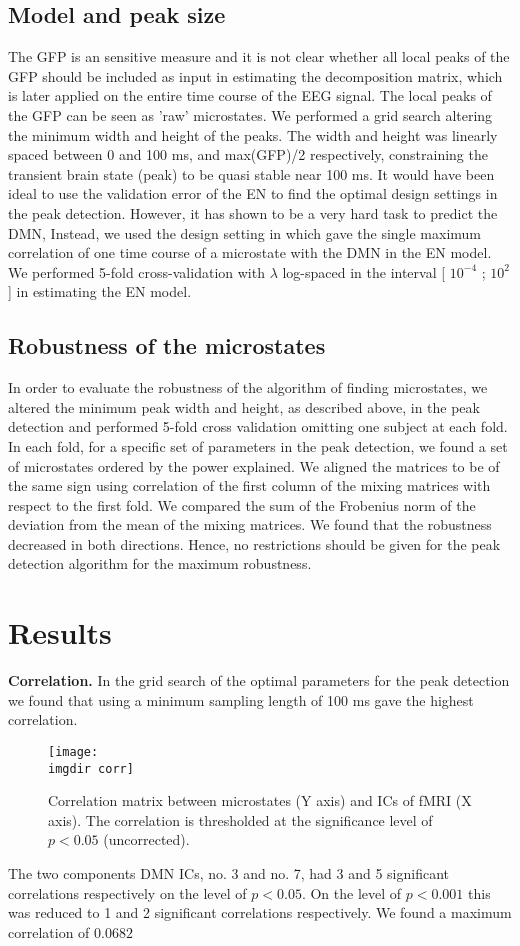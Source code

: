 \documentclass{article}
\newcommand{\imgdir}{Images/} %
\begin{document}
\subsection{Model and peak size}
The GFP is an sensitive measure and it is not clear whether all local peaks of the GFP should be included as input in estimating the decomposition matrix, which is later applied on the entire time course of the EEG signal. The local peaks of the GFP can be seen as 'raw' microstates. We performed a grid search altering the minimum width and height of the peaks. The width and height was linearly spaced between 0 and 100 ms, and max(GFP)/2 respectively, constraining the transient brain state (peak) to be quasi stable near 100 ms.
It would have been ideal to use the validation error of the EN to find the optimal design settings in the peak detection. However, it has shown to be a very hard task to predict the DMN, Instead, we used the design setting in which gave the single maximum correlation of one time course of a microstate with the DMN in the EN model.
We performed 5-fold cross-validation with $\lambda$ log-spaced in the interval 
[ $10^{-4}$ ; $10^2$] in estimating the EN model.
\subsection{Robustness of the microstates}
In order to evaluate the robustness of the algorithm of finding microstates, we altered the minimum peak width and height, as described above, in the peak detection and performed 5-fold cross validation omitting one subject at each fold. In each fold, for a specific set of parameters in the peak detection, we found a set of microstates ordered by the power explained. We aligned the matrices to be of the same sign using correlation of the first column of the mixing matrices with respect to the first fold. We compared the sum of the Frobenius norm of the deviation from the mean of the mixing matrices. We found that the robustness decreased in both directions. Hence, no restrictions should be given for the peak detection algorithm for the maximum robustness.
\section{Results}

\textbf{Correlation.} In the grid search of the optimal parameters for the peak detection we found that using a minimum sampling length of 100 ms gave the highest correlation.
\begin{figure}[!ht]
    \centering
    \texttt{[image: \\imgdir corr]}
    \caption{Correlation matrix between microstates (Y axis) and ICs of fMRI (X axis). The correlation is thresholded at the significance level of $p<0.05$ (uncorrected).}
    \label{fig:grid}
\end{figure}
The two components DMN ICs, no. 3 and no. 7, had 3 and 5 significant correlations respectively on the level of $p<0.05$. On the level of $p<0.001$ this was reduced to 1 and 2 significant correlations respectively. We found a maximum correlation of $0.0682$
\end{document}
